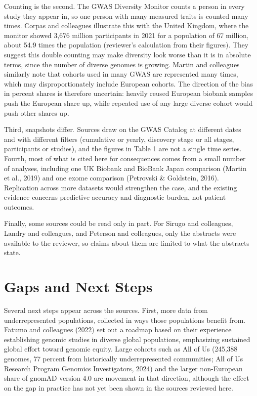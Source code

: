 \documentclass[12pt]{article}
\begin{document}
Counting is the second. The GWAS Diversity Monitor counts a person in every study they appear in, so one person with many measured traits is counted many times. Corpas and colleagues illustrate this with the United Kingdom, where the monitor showed 3,676 million participants in 2021 for a population of 67 million, about 54.9 times the population (reviewer's calculation from their figures). They suggest this double counting may make diversity look worse than it is in absolute terms, since the number of diverse genomes is growing. Martin and colleagues similarly note that cohorts used in many GWAS are represented many times, which may disproportionately include European cohorts. The direction of the bias in percent shares is therefore uncertain: heavily reused European biobank samples push the European share up, while repeated use of any large diverse cohort would push other shares up.

Third, snapshots differ. Sources draw on the GWAS Catalog at different dates and with different filters (cumulative or yearly, discovery stage or all stages, participants or studies), and the figures in Table 1 are not a single time series. Fourth, most of what is cited here for consequences comes from a small number of analyses, including one UK Biobank and BioBank Japan comparison (Martin et al., 2019) and one exome comparison (Petrovski \& Goldstein, 2016). Replication across more datasets would strengthen the case, and the existing evidence concerns predictive accuracy and diagnostic burden, not patient outcomes.

Finally, some sources could be read only in part. For Sirugo and colleagues, Landry and colleagues, and Peterson and colleagues, only the abstracts were available to the reviewer, so claims about them are limited to what the abstracts state.

\section*{Gaps and Next Steps}
Several next steps appear across the sources. First, more data from underrepresented populations, collected in ways those populations benefit from. Fatumo and colleagues (2022) set out a roadmap based on their experience establishing genomic studies in diverse global populations, emphasizing sustained global effort toward genomic equity. Large cohorts such as All of Us (245,388 genomes, 77 percent from historically underrepresented communities; All of Us Research Program Genomics Investigators, 2024) and the larger non-European share of gnomAD version 4.0 are movement in that direction, although the effect on the gap in practice has not yet been shown in the sources reviewed here.
\end{document}
